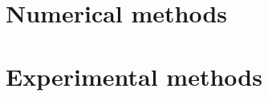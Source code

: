 \documentclass[letterpaper,12pt]{report}
\begin{document}

\tableofcontents

%
%
%

\chapter{Numerical methods}


\chapter{Experimental methods}


%
%
%
%
%

\label{endtext} 
\printbibliography
\end{document}
